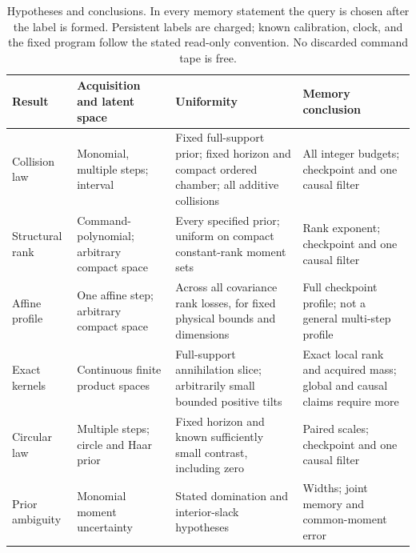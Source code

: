 \begin{table}[tbp]
\centering\footnotesize
\setlength{\tabcolsep}{4pt}
\begin{tabular}{@{}p{}p{}p{}p{}@{}}
\toprule
Result & Acquisition and latent space & Uniformity & Memory conclusion\\
\midrule
Collision law & Monomial, multiple steps; interval & Fixed full-support
prior; fixed horizon and compact ordered chamber; all additive collisions
& All integer budgets; checkpoint and one causal filter\\[3pt]
Structural rank & Command-polynomial; arbitrary compact space & Every
specified prior; uniform on compact constant-rank moment sets & Rank
exponent; checkpoint and one causal filter\\[3pt]
Affine profile & One affine step; arbitrary compact space & Across all
covariance rank losses, for fixed physical bounds and dimensions & Full
checkpoint profile; not a general multi-step profile\\[3pt]
Exact kernels & Continuous finite product spaces & Full-support
annihilation slice; arbitrarily small bounded positive tilts & Exact local
rank and acquired mass; global and causal claims require more\\[3pt]
Circular law & Multiple steps; circle and Haar prior & Fixed horizon and
known sufficiently small contrast, including zero & Paired scales;
checkpoint and one causal filter\\[3pt]
Prior ambiguity & Monomial moment uncertainty & Stated domination and
interior-slack hypotheses & Widths; joint memory and common-moment error\\
\bottomrule
\end{tabular}
\caption{Hypotheses and conclusions. In every memory statement the query
is chosen after the label is formed. Persistent labels are charged;
known calibration, clock, and the fixed program follow the stated
read-only convention. No discarded command tape is free.}
\label{tab:scope}
\end{table}
